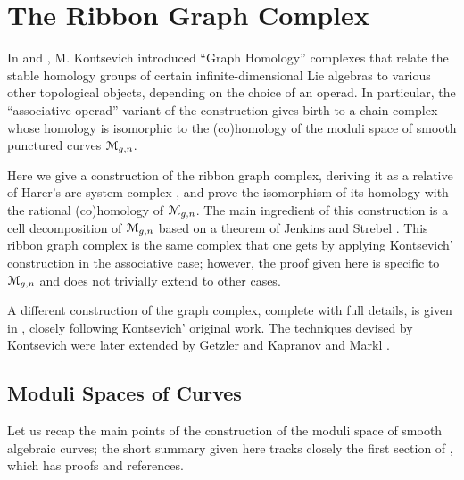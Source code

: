 

\chapter{The Ribbon Graph Complex}
\label{cha:ribbon-graph-complex}

In \cite{kontsevich;feynman} and \cite{kontsevich;1993}, M. Kontsevich
introduced ``Graph Homology'' complexes that relate the stable
homology groups of certain infinite-dimensional Lie algebras to
various other topological objects, depending on the choice of an
operad.  In particular, the ``associative operad'' variant of the
construction gives birth to a chain complex whose homology is
isomorphic to the (co)homology of the moduli space of smooth punctured
curves $\mathcal{M}_{g,n}$.

Here we give a construction of the ribbon graph complex, deriving it as
a relative of Harer's arc-system complex
\cite{harer;cohomological-dimension,
  harer;cohomology-of-moduli}, and prove the
isomorphism of its homology with the rational (co)homology of
$\mathcal{M}_{g,n}$.  The main ingredient of this construction is a cell
decomposition of $\mathcal{M}_{g,n}$ based on a theorem of Jenkins and Strebel
\cite{strebel;quadratic-differentials;1983}.  This ribbon graph
complex is the same complex that one gets by applying Kontsevich'
construction in the associative case; however, the proof given here is
specific to $\mathcal{M}_{g,n}$ and does not trivially extend to other cases.

A different construction of the graph complex, complete with full
details, is given in \cite{conant-vogtmann;2003}, closely following
Kontsevich' original work.  The techniques devised by Kontsevich were
later extended by Getzler and Kapranov \cite{getzler-kapranov} and
Markl \cite{markl;cyclic}.



\section{Moduli Spaces of Curves}
\label{sec:moduli-spaces}

Let us recap the main points of the construction of the moduli space
of smooth algebraic curves; the short summary given here tracks
closely the first section of \cite{looijenga;cellular-decomposition},
which has proofs and references.

